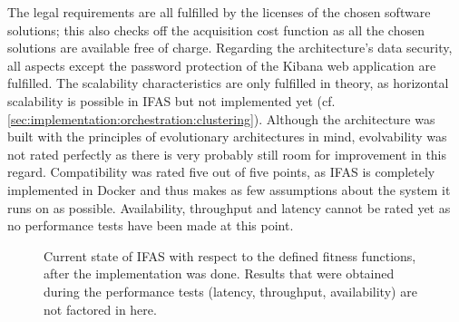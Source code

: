 The legal requirements are all fulfilled by the licenses of the chosen software solutions; this also checks off the acquisition cost function as all the chosen solutions are available free of charge.
Regarding the architecture's data security, all aspects except the password protection of the Kibana web application are fulfilled.
The scalability characteristics are only fulfilled in theory, as horizontal scalability is possible in \ac{IFAS} but not implemented yet (cf. \cref{sec:implementation:orchestration:clustering}).
Although the architecture was built with the principles of evolutionary architectures in mind, evolvability was not rated perfectly as there is very probably still room for improvement in this regard.
Compatibility was rated five out of five points, as \ac{IFAS} is completely implemented in Docker and thus makes as few assumptions about the system it runs on as possible.
Availability, throughput and latency cannot be rated yet as no performance tests have been made at this point.

\begin{figure}[ht]
        \caption[Current state of \ac{IFAS} with respect to the defined fitness functions, after the implementation was done.]{
        Current state of \ac{IFAS} with respect to the defined fitness functions, after the implementation was done.
        Results that were obtained during the performance tests (latency, throughput, availability) are not factored in here.
        }
        \label{figure:implementation:fitness}
\end{figure}

